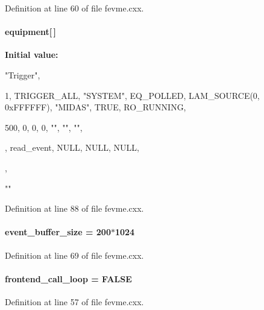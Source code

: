 Definition at line 60 of file fevme.cxx.
\paragraph[{equipment}]{ {\bf equipment}\mbox{[}$\,$\mbox{]}}\hfill\label{fevme_8cxx_aa86ef8764826784b74603ffb23852283}
{\bfseries Initial value:}
\begin{DoxyCode}
 {

    {"Trigger",               
     {1, TRIGGER_ALL,         
      "SYSTEM",               
      EQ_POLLED,              
      LAM_SOURCE(0, 0xFFFFFF),                      
      "MIDAS",                
      TRUE,                   
      RO_RUNNING,             

      500,                    
      0,                      
      0,                      
      0,                      
      "", "", "",}
     ,
     read_event,      
     NULL, NULL,
     NULL,       
    }
    ,

    {""}
  }
\end{DoxyCode}


Definition at line 88 of file fevme.cxx.
\paragraph[{event\_\-buffer\_\-size}]{ {\bf event\_\-buffer\_\-size} = 200$\ast$1024}\hfill\label{fevme_8cxx_a4411d7db6f901c968b946ed659d202f6}


Definition at line 69 of file fevme.cxx.
\paragraph[{frontend\_\-call\_\-loop}]{ {\bf frontend\_\-call\_\-loop} = FALSE}\hfill\label{fevme_8cxx_a0215c0a842a0e97fe65c7ef5fb7633a5}


Definition at line 57 of file fevme.cxx.
